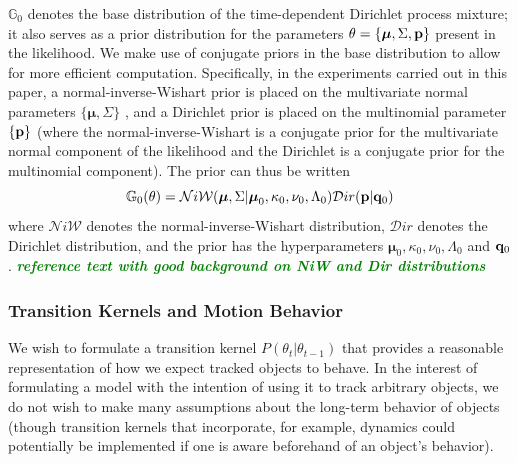 \documentclass[smallcondensed, final]{svjour3}
\newcommand{\willie}[1]{\textcolor{green}{\textsf{\emph{\textbf{\textcolor{green}{#1}}}}}}
\begin{document}
$\mathbb{G}_{0}$ denotes the base distribution of the time-dependent Dirichlet process mixture; it also serves as a prior distribution for the parameters $\theta = \{ \boldsymbol{\mu}, \Sigma, \bold{p} \}$ present in the likelihood. We make use of conjugate priors in the base distribution to allow for more efficient computation. Specifically, in the experiments carried out in this paper, a normal-inverse-Wishart prior is placed on the multivariate normal parameters $\{ \boldsymbol{\mu}, \Sigma \}$ , and a Dirichlet prior is placed on the multinomial parameter $ \{  \bold{p}  \} $ (where the normal-inverse-Wishart is a conjugate prior for the multivariate normal component of the likelihood and the Dirichlet is a conjugate prior for the multinomial component). The prior can thus be written
\begin{equation} \label{basedistro}
\mathbb{G}_{0}(\theta) = \mathcal{N}i\mathcal{W}(\boldsymbol{\mu}, \Sigma | \boldsymbol{\mu}_{0}, \kappa_{0}, \nu_{0}, \Lambda_{0})  \mathcal{D}ir( \bold{p} | \bold{q}_{0})
\end{equation}
where $\mathcal{N}i\mathcal{W}$ denotes the normal-inverse-Wishart distribution, $\mathcal{D}ir$ denotes the Dirichlet distribution, and the prior has the hyperparameters $\boldsymbol{\mu}_{0}, \kappa_{0}, \nu_{0}, \Lambda_{0}$ and $\bold{q}_{0}$.  \willie{reference text with good background on NiW and Dir distributions}



\subsubsection{Transition Kernels and Motion Behavior}

We wish to formulate a transition kernel $P(\theta_{t} | \theta_{t-1})$ that provides a reasonable representation of how we expect tracked objects to behave. In the interest of formulating a model with the intention of using it to track arbitrary objects, we do not wish to make many assumptions about the long-term behavior of objects (though transition kernels that incorporate, for example, dynamics could potentially be implemented if one is aware beforehand of an object's behavior).
\end{document}
